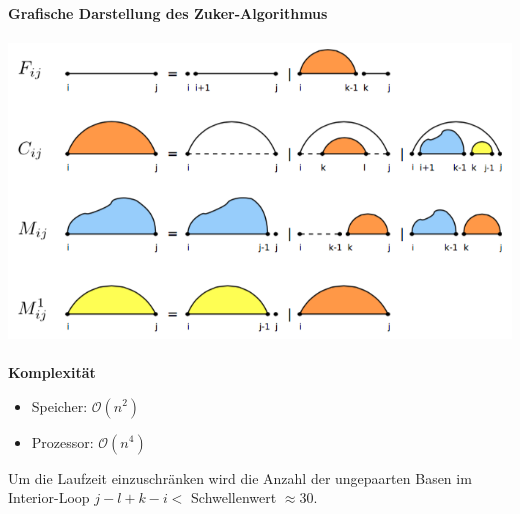 \paragraph{}
 \textbf{Grafische Darstellung des Zuker-Algorithmus}\\\\
\includegraphics[scale=0.55]{lectures/160404_2/pix/zuker_lorenz.png}\\
\paragraph{}
 \textbf{Komplexit\"at}
\begin{itemize}
	\item[] Speicher: $\mathcal{O}(n^2)$
	\item[] Prozessor: $\mathcal{O}(n^4)$
\end{itemize}
Um die Laufzeit einzuschr\"anken wird die Anzahl der ungepaarten Basen im Interior-Loop $j-l+k-i<$ Schwellenwert $\approx 30$.